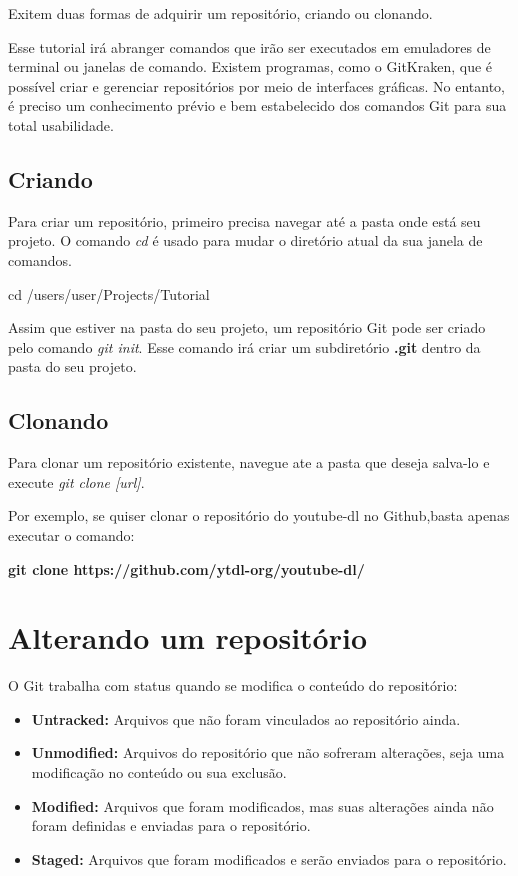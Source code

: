 \documentclass[]{article}
\begin{document}
Exitem duas formas de adquirir um repositório, criando ou clonando.

Esse tutorial irá abranger comandos que irão ser executados em emuladores de terminal ou janelas de comando. 
Existem programas, como o GitKraken, que é possível criar e gerenciar repositórios por meio de interfaces gráficas. 
No entanto, é preciso um conhecimento prévio e bem estabelecido dos comandos Git para sua total usabilidade.

\subsection*{Criando}

Para criar um repositório, primeiro precisa navegar até a pasta onde está seu projeto. 
O comando \textit{cd} é usado para mudar o diretório atual da sua janela de comandos.

cd /users/user/Projects/Tutorial

Assim que estiver na pasta do seu projeto, um repositório Git pode ser criado pelo comando \textit{git init}.
 Esse comando irá criar um subdiretório \textbf{ .git } dentro da pasta do seu projeto.

\subsection*{Clonando}

Para clonar um repositório existente, navegue ate a pasta que deseja salva-lo e execute \textit{git clone [url]}.

Por exemplo, se quiser clonar o repositório do youtube-dl no Github,basta apenas executar o comando: 

\textbf{git clone https://github.com/ytdl-org/youtube-dl/}

\section{Alterando um repositório}

O Git trabalha com status quando se modifica o conteúdo do repositório:

\begin{itemize}
    \item {\textbf{Untracked: }} Arquivos que não foram vinculados ao repositório ainda.
    \item {\textbf{Unmodified: }} Arquivos do repositório que não sofreram alterações, seja uma modificação no conteúdo ou sua exclusão.
    \item {\textbf{Modified: }} Arquivos que foram modificados, mas suas alterações ainda não foram definidas e enviadas para o repositório.
    \item {\textbf{Staged: }} Arquivos que foram modificados e serão enviados para o repositório.
\end{itemize}
\end{document}
